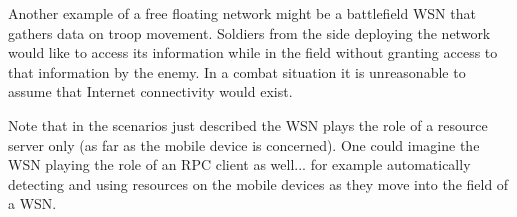 \documentclass{article}
\begin{document}
Another example of a free floating network might be a battlefield WSN that gathers data on troop
movement. Soldiers from the side deploying the network would like to access its information
while in the field without granting access to that information by the enemy. In a combat
situation it is unreasonable to assume that Internet connectivity would exist.

Note that in the scenarios just described the WSN plays the role of a resource server only (as
far as the mobile device is concerned). One could imagine the WSN playing the role of an RPC
client as well... for example automatically detecting and using resources on the mobile devices
as they move into the field of a WSN.



\end{document}
